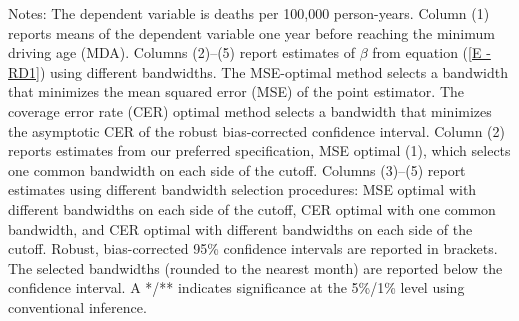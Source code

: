 \documentclass{article}
\begin{document}
\begin{table}[tbp]
{\begin{tabularx}{\linewidth}{lCcCcCc}
\end{tabularx}
\begin{flushleft}
\scriptsize Notes: The dependent variable is deaths per 100,000 person-years. Column (1) reports means of the dependent variable one year before reaching the minimum driving age (MDA). Columns (2)--(5) report estimates of \(\beta\) from equation (\ref{E - RD1}) using different bandwidths. The MSE-optimal method selects a bandwidth that minimizes the mean squared error (MSE) of the point estimator. The coverage error rate (CER) optimal method selects a bandwidth that minimizes the asymptotic CER of the robust bias-corrected confidence interval.  Column (2) reports estimates from our preferred specification, MSE optimal (1), which selects one common bandwidth on each side of the cutoff. Columns (3)--(5) report estimates using different bandwidth selection procedures: MSE optimal with different bandwidths on each side of the cutoff, CER optimal with one common bandwidth, and CER optimal with different bandwidths on each side of the cutoff. Robust, bias-corrected 95\% confidence intervals are reported in brackets. The selected bandwidths (rounded to the nearest month) are reported below the confidence interval. A */** indicates significance at the 5\%/1\% level using conventional inference.
\end{flushleft}
}
\end{table}
\end{document}
